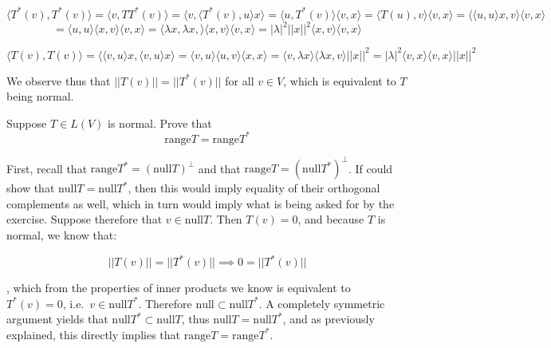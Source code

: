 \begin{solution}
    $$\langle T^*(v), T^*(v) \rangle = \langle v, TT^*(v) \rangle = \langle v, \langle T^*(v), u \rangle x \rangle = \langle u, T^*(v) \rangle \langle v, x \rangle = \langle T(u), v \rangle \langle v, x \rangle = \langle \langle u, u \rangle x, v \rangle \langle v, x \rangle$$
    $$ = \langle u, u \rangle \langle x, v \rangle \langle v, x \rangle = \langle \lambda x, \lambda x, \rangle \langle x, v \rangle \langle v, x \rangle = \lvert \lambda \rvert^2 \lvert \lvert x \rvert \rvert^2 \langle x, v \rangle \langle v, x \rangle$$

    $$\langle T(v), T(v) \rangle = \langle \langle v, u \rangle x, \langle v, u \rangle x \rangle = \langle v, u \rangle \langle u, v \rangle \langle x, x \rangle = \langle v, \lambda x \rangle \langle \lambda x, v \rangle \lvert \lvert x \rvert \rvert^2 = \lvert \lambda \rvert^2 \langle v, x \rangle \langle v, x \rangle \lvert \lvert x \rvert \rvert^2$$

    We observe thus that $\lvert \lvert T(v) \rvert \rvert = \lvert \lvert T^*(v) \rvert \rvert$ for all $v \in V$, which is equivalent to $T$ being normal.
\end{solution}

\begin{exercise}{16}
    Suppose $T \in L(V)$ is normal. Prove that 
    $$\text{range} T = \text{range} T^*$$
\end{exercise}

\begin{solution}

    First, recall that $\text{range} T^* = (\text{null}T)^\bot$ and that $\text{range} T = (\text{null}T^*)^\bot$. If could show that $\text{null} T = \text{null} T^*$, then this would imply equality of their orthogonal complements as well, which in turn would imply what is being asked for by the exercise. Suppose therefore that $v \in \text{null} T$. Then $T(v) = 0$, and because $T$ is normal, we know that:

    $$\lvert \lvert T(v) \rvert \rvert = \lvert \lvert T^*(v) \rvert \rvert \implies 0 = \lvert \lvert T^*(v) \rvert \rvert$$

    , which from the properties of inner products we know is equivalent to $T^*(v) = 0$, i.e.\ $v \in \text{null}T^*$. Therefore $\text{null} \subset \text{null} T^*$. A completely symmetric argument yields that $\text{null} T^* \subset \text{null} T$, thus $\text{null} T = \text{null} T^*$, and as previously explained, this directly implies that $\text{range} T = \text{range} T^*$.
\end{solution}


